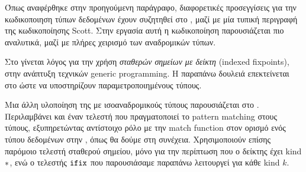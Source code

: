 
Όπως αναφέρθηκε στην προηγούμενη παράγραφο, διαφορετικές προσεγγίσεις για την κωδικοποιηση
τύπων δεδομένων έχουν συζητηθεί στο \cite{scott}, μαζί με μία τυπική περιγραφή της κωδικοποίησης
Scott. Στην εργασία αυτή η κωδικοποίηση παρουσιάζεται πιο αναλυτικά, μαζί με πλήρες χειρισμό
των αναδρομικών τύπων.

Στο \cite{fixmutualgeneric} γίνεται λόγος για την χρήση \textit{σταθερών σημείων με δείκτη} (indexed 
fixpoints), στην ανάπτυξη τεχνικών generic programming. Η παραπάνω δουλειά επεκτείνεται στο 
\cite{genericwithindexed} ώστε να υποστηρίζουν παραμετροποιημένους τύπους.

Μια άλλη υλοποίηση της \FOMF με ισοαναδρομικούς τύπους παρουσιάζεται στο \cite{BrownP17}.
Περιλαμβάνει και έναν  τελεστή που πραγματοποιεί το pattern matching στους τύπους, εξυπηρετώντας
αντίστοιχο ρόλο με την match function στον ορισμό ενός τύπου δεδομένων στην \FIR{}, όπως θα
δούμε στη συνέχεια. Χρησιμοποιούν επίσης παρόμοιο τελεστή σταθερού σημείου, μόνο για
την περίπτωση που ο δείκτης έχει kind $\operatorname{\ast}$, ενώ ο τελεστής $\operatorname{\texttt{ifix}}$ που παρουσιάσαμε
παραπάνω λειτουργεί για κάθε kind $k$. 